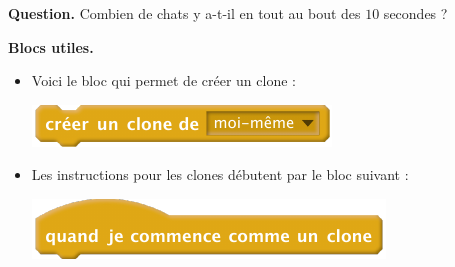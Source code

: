 \documentclass[class=report,crop=false, 12pt]{standalone}
\begin{document}
\begin{enigme}
\bigskip

\textbf{Question.} Combien de chats y a-t-il en tout au bout des $10$ secondes ?
\bigskip

\textbf{Blocs utiles.} 
\begin{itemize}
  \item Voici le bloc qui permet de créer un clone :
\begin{center}
  \includegraphics[scale=\scalebloc]{bloc-08-eg2a} 
\end{center}

  \item Les instructions pour les clones débutent par le bloc suivant :
\begin{center}
  \includegraphics[scale=\scalebloc]{bloc-08-eg2b} 
\end{center}
\end{itemize}


\end{enigme}
\end{document}
